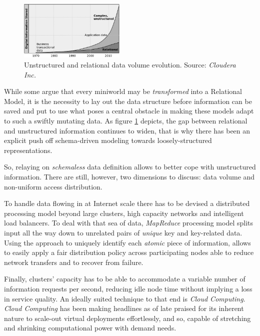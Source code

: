 \documentclass{sig-alternate}
\begin{document}
\begin{figure}[tp]
\centering
\includegraphics[width=0.45\textwidth]{img/001}
\caption{Unstructured and relational data volume evolution. Source: \emph{Cloudera Inc.}}
\label{fig:trend}
\end{figure}

While some argue that every miniworld may be \emph{transformed} into a Relational Model, it is the necessity to lay out the data structure before information can be saved and put to use what poses a central obstacle in making these models adapt to such a swiftly mutating data. As figure \ref{fig:trend} depicts, the gap between relational and unstructured information continues to widen, that is why there has been an explicit push off schema-driven modeling towards loosely-structured representations.

So, relaying on \emph{schemaless} data definition allows to better cope with unstructured information. There are still, however, two dimensions to discuss: data volume and non-uniform access distribution.

To handle data flowing in at Internet scale there has to be devised a distributed processing model beyond large clusters, high capacity networks and intelligent load balancers. To deal with that sea of data, \emph{MapReduce} processing model splits input all the way down to unrelated pairs of \emph{unique} key and key-related data. Using the approach to uniquely identify each \emph{atomic} piece of information, allows to easily apply a fair distribution policy across participating nodes able to reduce network transfers and to recover from failure.

Finally, clusters' capacity has to be able to accommodate a variable number of information requests per second, reducing idle node time without implying a loss in service quality. An ideally suited technique to that end is \emph{Cloud Computing}. \emph{Cloud Computing} has been making headlines as of late praised for its inherent nature to scale-out virtual deployments effortlessly, and so, capable of stretching and shrinking computational power with demand needs.
\end{document}
